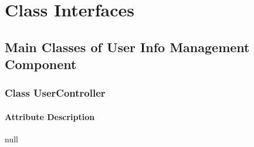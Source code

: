 \documentclass[16pt]{scrreprt}
\begin{document}
%

\chapter{Class Interfaces}

\section{Main Classes of User Info Management Component}

\subsection{Class UserController}
\subsubsection{Attribute Description}
null
\end{document}
